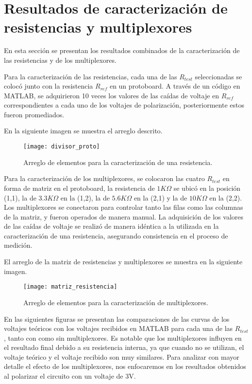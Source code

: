 \section{Resultados de caracterización de resistencias y multiplexores}  
En esta sección se presentan los resultados combinados de la caracterización de las resistencias y de los multiplexores.


Para la caracterización de las resistencias, cada una de las $R_{test}$ seleccionadas se colocó junto con la resistencia $R_{ref}$ en un protoboard. A través de un código en MATLAB, se adquirieron 10 veces los valores de las caídas de voltaje en $R_{ref}$ correspondientes a cada uno de los voltajes de polarización, posteriormente estos fueron promediados.


En la siguiente imagen se muestra el arreglo descrito.

            \begin{figure}[hbtp]
                \centering
                \texttt{[image: divisor\_proto]}
                \caption{Arreglo de elementos para la caracterización de una resistencia.}
                \label{fig:divisor_proto}
            \end{figure} 

Para la caracterización de los multiplexores, se colocaron las cuatro $R_{test}$ en forma de matriz en el protoboard, la resistencia de $1K\Omega$ se ubicó en la posición (1,1), la de $3.3K\Omega$ en la (1,2), la de $5.6K\Omega$ en la (2,1) y la de $10K\Omega$ en la (2,2). Los multiplexores se conectaron para controlar tanto las filas como las columnas de la matriz, y fueron operados de manera manual. La adquisición de los valores de las caídas de voltaje se realizó de manera idéntica a la utilizada en la caracterización de una resistencia, asegurando consistencia en el proceso de medición.


El arreglo de la matriz de resistencias y multiplexores se muestra en la siguiente imagen.

            \begin{figure}[hbtp]
                \centering
                \texttt{[image: matriz\_resistencia]}
                \caption{Arreglo de elementos para la caracterización de multiplexores.}
                \label{fig:matriz_resistencia}
            \end{figure} 

En las siguientes figuras se presentan las comparaciones de las curvas de los voltajes teóricos con los voltajes recibidos en MATLAB para cada una de las $R_{test}$, tanto con como sin multiplexores. Es notable que los multiplexores influyen en el resultado final debido a su resistencia interna, ya que cuando no se utilizan, el voltaje teórico y el voltaje recibido son muy similares. Para analizar con mayor detalle el efecto de los multiplexores, nos enfocaremos en los resultados obtenidos al polarizar el circuito con un voltaje de 3V.


